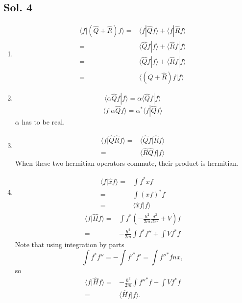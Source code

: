 \subsection*{Sol. 4}
\begin{enumerate}
    \item 
    \begin{align*}
    \langle f|(\hat{Q}+\hat{R})f\rangle
    =&
    \langle f|\hat{Q}f\rangle+
    \langle f|\hat{R}f\rangle\\
    =&
    \langle \hat{Q}f|f\rangle+
    \langle \hat{R}f|f\rangle\\
    =&
    \langle \hat{Q}f|f\rangle+
    \langle \hat{R}f|f\rangle\\
    =&\langle (\hat{Q}+\hat{R})f|f\rangle
    \end{align*}
    \item 
    $$
    \langle \alpha\hat{Q}f|f\rangle
    =
    \alpha
    \langle \hat{Q}f|f\rangle
    $$
    $$
    \langle f|\alpha\hat{Q}f\rangle=
    \alpha^*
    \langle f|\hat{Q}f\rangle
    $$
    $\alpha$ has to be real.
    \item 
    \begin{align*}
    \langle f|\hat{Q}\hat{R}f\rangle
    =&
    \langle \hat{Q}f|\hat{R}f\rangle\\
    =&\langle \hat{R}\hat{Q}f|f\rangle
    \end{align*}
    When these two hermitian operators commute, their product is hermitian.
    \item 
    \begin{align*}
        \langle f|\hat{x}f\rangle
        =& 
        \int f^* xf\\
        =& 
        \int (xf)^* f\\
        =&\langle \hat{x}f|f\rangle
    \end{align*}
    \begin{align*}
        \langle f|\hat{H}f\rangle
        =& 
        \int f^* \left(-\frac{\hbar^2}{2m}\frac{d^2}{dx^2}+V\right)f\\
        =& 
        -\frac{\hbar^2}{2m}\int f^* f'' + \int Vf^*f
    \end{align*}
    Note that using integration by parts
    $$
    \int f^* f''= -\int f'^*f' = \int f''^*fnx,
    $$
    so 
    \begin{align*}
        \langle f|\hat{H}f\rangle=&
        -\frac{\hbar^2}{2m}\int f''^* f + \int Vf^*f\\
        =&\langle \hat{H}f|f\rangle.
    \end{align*}
    
    
    
\end{enumerate}


